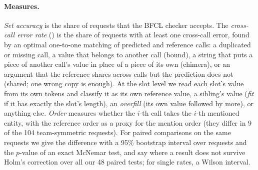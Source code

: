 \paragraph{Measures.} \emph{Set accuracy} is the share of requests that the BFCL checker accepts. The \emph{cross-call error rate} (\ccer) is the share of requests with at least one cross-call error, found by an optimal one-to-one matching of predicted and reference calls: a duplicated or missing call, a value that belongs to another call (bound), a string that puts a piece of another call's value in place of a piece of its own (chimera), or an argument that the reference shares across calls but the prediction does not (shared; one wrong copy is enough). At the slot level we read each slot's value from its own tokens and classify it as its own reference value, a sibling's value (\emph{fit} if it has exactly the slot's length), an \emph{overfill} (its own value followed by more), or anything else. \emph{Order} measures whether the $i$-th call takes the $i$-th mentioned entity, with the reference order as a proxy for the mention order (they differ in 9 of the 104 team-symmetric requests). For paired comparisons on the same requests we give the difference with a 95\% bootstrap interval over requests and the $p$-value of an exact McNemar test, and say where a result does not survive Holm's correction over all our 48 paired tests; for single rates, a Wilson interval.
